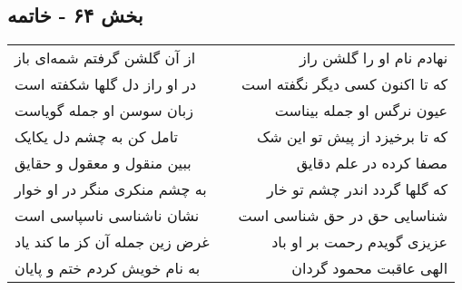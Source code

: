 \begin{center}
\section*{بخش ۶۴ - خاتمه}
\label{sec:sh064}
\begin{longtable}{l p{0.5cm} r}
از آن گلشن گرفتم شمه‌ای باز
&&
نهادم نام او را گلشن راز
\\
در او راز دل گلها شکفته است
&&
که تا اکنون کسی دیگر نگفته است
\\
زبان سوسن او جمله گویاست
&&
عیون نرگس او جمله بیناست
\\
تامل کن به چشم دل یکایک
&&
که تا برخیزد از پیش تو این شک
\\
ببین منقول و معقول و حقایق
&&
مصفا کرده در علم دقایق
\\
به چشم منکری منگر در او خوار
&&
که گلها گردد اندر چشم تو خار
\\
نشان ناشناسی ناسپاسی است
&&
شناسایی حق در حق شناسی است
\\
غرض زین جمله آن کز ما کند یاد
&&
عزیزی گویدم رحمت بر او باد
\\
به نام خویش کردم ختم و پایان
&&
الهی عاقبت محمود گردان
\\
\end{longtable}
\end{center}
